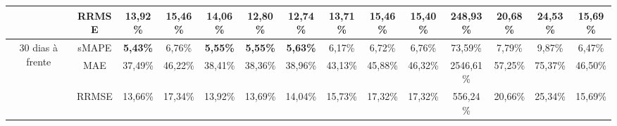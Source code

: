 \begin{landscape}
\begin{table}[!htpb]
\begin{tabular}{@{}cccccccccccccc@{}}
	& RRMSE    & 13,92\%         & 15,46\% & 14,06\%         & 12,80\%         & 12,74\%         & 13,71\%         & 15,46\% & 15,40\% & 248,93\%  & 20,68\% & 24,53\% & 15,69\% \\ \midrule
	\multirow{3}{*}{30 dias à frente} & sMAPE    & \textbf{5,43\%} & 6,76\%  & \textbf{5,55\%} & \textbf{5,55\%} & \textbf{5,63\%} & 6,17\%          & 6,72\%  & 6,76\%  & 73,59\%   & 7,79\%  & 9,87\%  & 6,47\%  \\
	& MAE      & 37,49\%         & 46,22\% & 38,41\%         & 38,36\%         & 38,96\%         & 43,13\%         & 45,88\% & 46,32\% & 2546,61\% & 57,25\% & 75,37\% & 46,50\% \\
	& RRMSE    & 13,66\%         & 17,34\% & 13,92\%         & 13,69\%         & 14,04\%         & 15,73\%         & 17,32\% & 17,32\% & 556,24\%  & 20,66\% & 25,34\% & 15,69\% \\ \cmidrule(l){1-14} 
\end{tabular}
	
\end{table}

\newpage


\end{landscape}
